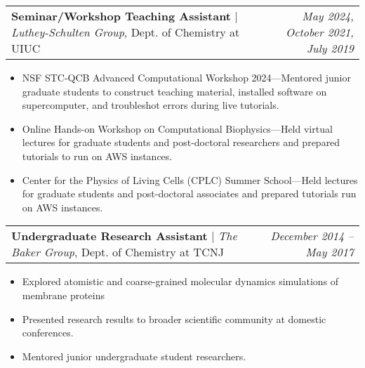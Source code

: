 \documentclass[letterpaper,10pt]{article}
\makeatletter
\newcommand{\experienceitemvspace}{3pt}
\newcommand{\resumeItem}[1]{
  \item{
    {#1 \vspace{-4pt}}
  }
}
\newcommand{\titleItem}[1]{
  \textbf{#1}
}
\newcommand{\resumeProjectHeading}[2]{
    \item
    \begin{tabular*}{0.97\textwidth}{l@{\extracolsep{\fill}}r}
      #1 & \textit{ #2} \\
    \end{tabular*}\vspace{-9pt}
}
\newcommand{\resumeItemListStart}{
\begin{itemize}}
\newcommand{\resumeItemListEnd}{
\end{itemize}\vspace{-8pt}}
\makeatother
\begin{document}

\vspace{\experienceitemvspace}
\resumeProjectHeading
{\titleItem{{Seminar/Workshop Teaching Assistant}} $|$ \emph{Luthey-Schulten Group}, Dept. of Chemistry at UIUC}{\textcolor{color2}{May 2024, October 2021, July 2019}}
\vspace{2pt}
\resumeItemListStart
\resumeItem{NSF STC-QCB Advanced Computational Workshop 2024---Mentored junior graduate students to construct teaching material, installed software on supercomputer, and troubleshot errors during live tutorials.}
\resumeItem{Online Hands-on Workshop on Computational Biophysics---Held virtual lectures for graduate students and post-doctoral researchers and prepared tutorials to run on AWS instances.}
\resumeItem{Center for the Physics of Living Cells (CPLC) Summer School---Held lectures for graduate students and post-doctoral associates and prepared tutorials run on AWS instances.}
\resumeItemListEnd


\vspace{\experienceitemvspace}
\resumeProjectHeading
{\titleItem{{Undergraduate Research Assistant}} $|$ \emph{The Baker Group}, Dept. of Chemistry at TCNJ}{\textcolor{color2}{December 2014 -- May 2017}}
\vspace{2pt}
\resumeItemListStart
\resumeItem{Explored atomistic and coarse-grained molecular dynamics simulations of membrane proteins}
\resumeItem{Presented research results to broader scientific community at domestic conferences.}
\resumeItem{Mentored junior undergraduate student researchers.}
\resumeItemListEnd
\end{document}
